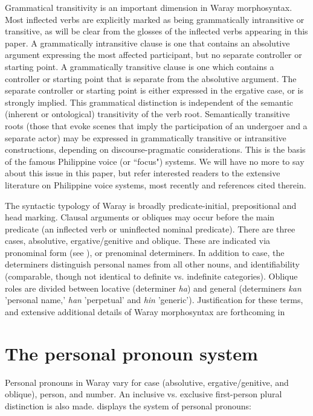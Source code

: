 \documentclass[output=paper]{langscibook}
\begin{document}
Grammatical transitivity is an important dimension in Waray morphosyntax. Most inflected verbs are explicitly marked as being grammatically intransitive or transitive, as will be clear from the glosses of the inflected verbs appearing in this paper. A grammatically intransitive clause is one that contains an absolutive argument expressing the most affected participant, but no separate controller or starting point. A grammatically transitive clause is one which contains a controller or starting point that is separate from the absolutive argument. The separate controller or starting point is either expressed in the ergative case, or is strongly implied. This grammatical distinction is independent of the semantic (inherent or ontological) transitivity of the verb root. Semantically transitive roots (those that evoke scenes that imply the participation of an undergoer and a separate actor) may be expressed in grammatically transitive or intransitive constructions, depending on discourse-pragmatic considerations. This is the basis of the famous Philippine voice (or ``focus") systems. We will have no more to say about this issue in this paper, but refer interested readers to the extensive literature on Philippine voice systems, most recently  \citet{PayneOyzon2018} and references cited therein.

The syntactic typology of Waray is broadly predicate-initial, prepositional and head marking. Clausal arguments or obliques may occur before the main predicate (an inflected verb or uninflected nominal predicate). There are three cases, absolutive, ergative/genitive and oblique. These are indicated via pronominal form (see ), or prenominal determiners. In addition to case, the determiners distinguish personal names from all other nouns, and identifiability (comparable, though not identical to definite vs. indefinite categories). Oblique roles are divided between locative (determiner \textit{ha}) and general (determiners \textit{kan} 'personal name,' \textit{han} 'perpetual' and \textit{hin} 'generic'). Justification for these terms, and extensive additional details of Waray morphosyntax are forthcoming in\citet{OyzonPayneinprep} 



\section{The personal pronoun system}\label{sec:Payne:3} 

Personal pronouns in Waray vary for case (absolutive, ergative/genitive, and oblique), person, and number. An inclusive vs. exclusive first-person plural distinction is also made.  displays the system of personal pronouns:
\end{document}
